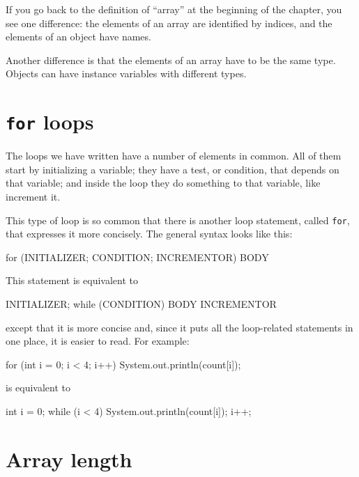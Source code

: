 If you go back to the definition of ``array'' at the beginning
of the chapter, you see one difference: the
elements of an array are identified by indices, and the
elements of an object have names.

Another difference is that the
elements of an array have to be the same type.  Objects can
have instance variables with different types.


\section{{\tt for} loops}
\label{for}

The loops we have written have a number of elements
in common.  All of them start by initializing a variable;
they have a test, or condition, that depends on that variable;
and inside the loop they do something to that variable,
like increment it.


This type of loop is so common that there is another
loop statement, called {\tt for}, that expresses it more
concisely.  The general syntax looks like this:

\begin{code}
    for (INITIALIZER; CONDITION; INCREMENTOR) {
        BODY
    }
\end{code}

This statement is equivalent to

\begin{code}
    INITIALIZER;
    while (CONDITION) {
        BODY
        INCREMENTOR
    }
\end{code}

except that it is more concise and, since it puts all the
loop-related statements in one place, it is easier to read.
For example:

\begin{code}
    for (int i = 0; i < 4; i++) {
        System.out.println(count[i]);
    }
\end{code}

is equivalent to

\begin{code}
    int i = 0;
    while (i < 4) {
        System.out.println(count[i]);
        i++;
    }
\end{code}


\section{Array length}

